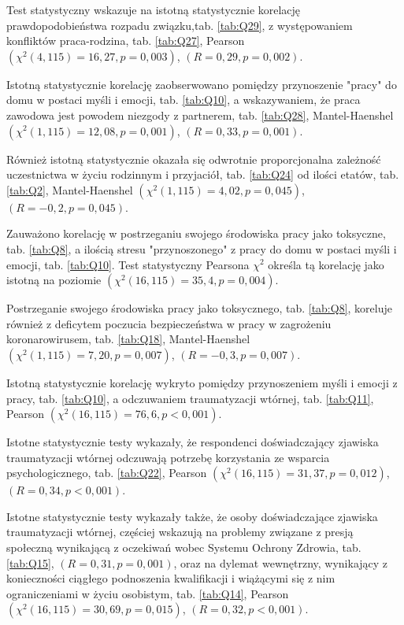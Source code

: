 \documentclass[a4paper,12pt,twoside,openright]{mwrep}
\begin{document}
	Test statystyczny wskazuje na istotną statystycznie korelację prawdopodobieństwa rozpadu związku,tab. \ref{tab:Q29}, z występowaniem konfliktów praca-rodzina, tab. \ref{tab:Q27}, Pearson $(\chi^2 (4, 115) = 16,27, p=0,003)$, $(R = 0,29, p = 0,002)$.
	
	Istotną statystycznie korelację zaobserwowano pomiędzy przynoszenie "pracy" do domu w postaci myśli i emocji, tab. \ref{tab:Q10}, a wskazywaniem, że praca zawodowa jest powodem niezgody z partnerem, tab. \ref{tab:Q28}, Mantel-Haenshel $(\chi^2 (1, 115) = 12,08, p=0,001)$, $(R = 0,33, p = 0,001)$.

Również istotną statystycznie okazała się odwrotnie proporcjonalna zależność uczestnictwa w życiu rodzinnym i przyjaciół, tab. \ref{tab:Q24} od ilości etatów, tab. \ref{tab:Q2}, Mantel-Haenshel $(\chi^2 (1, 115) = 4,02, p=0,045)$, $(R = -0,2, p = 0,045)$. 
	

Zauważono korelację w postrzeganiu swojego środowiska pracy jako toksyczne, tab. \ref{tab:Q8}, a ilością stresu "przynoszonego" z pracy do domu w postaci myśli i emocji, tab. \ref{tab:Q10}. Test statystyczny Pearsona $\chi^2$ określa tą korelację jako istotną na poziomie $(\chi^2 (16, 115) = 35,4, p = 0,004)$.

Postrzeganie swojego środowiska pracy jako toksycznego, tab. \ref{tab:Q8}, koreluje również z deficytem poczucia bezpieczeństwa w pracy w zagrożeniu koronarowirusem, tab. \ref{tab:Q18}, Mantel-Haenshel $(\chi^2 (1, 115) = 7,20, p=0,007)$, $(R = -0,3, p = 0,007)$. 

Istotną statystycznie korelację wykryto pomiędzy przynoszeniem myśli i emocji z pracy, tab. \ref{tab:Q10}, a odczuwaniem traumatyzacji wtórnej, tab. \ref{tab:Q11}, Pearson $(\chi^2 (16, 115) = 76,6, p < 0,001)$.
  
Istotne statystycznie testy wykazały, że respondenci doświadczający zjawiska traumatyzacji wtórnej odczuwają potrzebę korzystania ze wsparcia psychologicznego, tab. \ref{tab:Q22}, Pearson $(\chi^2 (16, 115) = 31,37, p = 0,012)$,  $(R = 0,34, p < 0,001)$.

Istotne statystycznie testy wykazały także, że osoby doświadczające zjawiska traumatyzacji wtórnej, częściej wskazują na problemy związane z presją społeczną wynikającą z oczekiwań wobec Systemu Ochrony Zdrowia, tab. \ref{tab:Q15}, $(R = 0,31, p = 0,001)$, oraz na dylemat wewnętrzny, wynikający z konieczności ciągłego podnoszenia kwalifikacji i wiążącymi się z nim ograniczeniami w życiu osobistym, tab. \ref{tab:Q14}, Pearson $(\chi^2 (16, 115) = 30,69, p = 0,015)$,  $(R = 0,32, p < 0,001)$.
\end{document}
